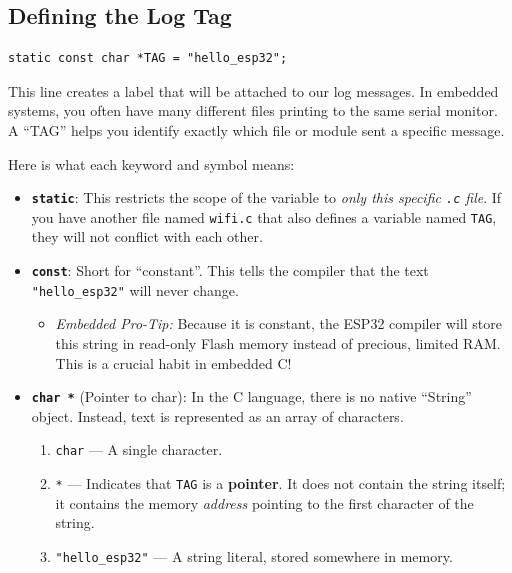 \documentclass[11pt]{article}
\begin{document}
\subsection*{ Defining the Log Tag}

\begin{verbatim}
static const char *TAG = "hello_esp32";
\end{verbatim}

This line creates a label that will be attached to our log messages. In embedded systems, you often have many different files printing to the same serial monitor. A ``TAG'' helps you identify exactly which file or module sent a specific message.

Here is what each keyword and symbol means:

\begin{itemize}
    \item \textbf{\texttt{static}}: This restricts the scope of the variable to \emph{only this specific \texttt{.c} file}. If you have another file named \texttt{wifi.c} that also defines a variable named \texttt{TAG}, they will not conflict with each other.

    \item \textbf{\texttt{const}}: Short for ``constant''. This tells the compiler that the text \texttt{"hello\_esp32"} will never change.
    \begin{itemize}
        \item \emph{Embedded Pro-Tip:} Because it is constant, the ESP32 compiler will store this string in read-only Flash memory instead of precious, limited RAM. This is a crucial habit in embedded C!
    \end{itemize}

    \item \textbf{\texttt{char *}} (Pointer to char): In the C language, there is no native ``String'' object. Instead, text is represented as an array of characters.
    \begin{enumerate}
        \item \texttt{char} --- A single character.
        \item \texttt{*} --- Indicates that \texttt{TAG} is a \textbf{pointer}. It does not contain the string itself; it contains the memory \emph{address} pointing to the first character of the string.
        \item \texttt{"hello\_esp32"} --- A string literal, stored somewhere in memory.
    \end{enumerate}
\end{itemize}
\end{document}
